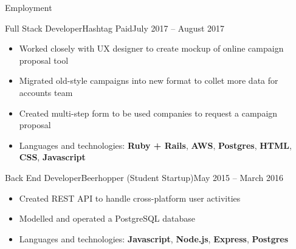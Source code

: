 \documentclass[calibri]{mcdowellcv}
\begin{document}
    \makeheader

    \begin{cvsection}{Employment}
        \begin{cvsubsection}{Full Stack Developer}{Hashtag Paid}{July 2017 -- August 2017}
            \begin{itemize}
                \item Worked closely with UX designer to create mockup of online campaign proposal tool
                \item Migrated old-style campaigns into new format to collet more data for accounts team
                \item Created multi-step form to be used companies to request a campaign proposal
                \item Languages and technologies: \textbf{Ruby + Rails}, \textbf{AWS}, \textbf{Postgres}, \textbf{HTML}, \textbf{CSS}, \textbf{Javascript}
            \end{itemize}
        \end{cvsubsection}

        \begin{cvsubsection}{Back End Developer}{Beerhopper (Student Startup)}{May 2015 -- March 2016}
            \begin{itemize}
                \item Created REST API to handle cross-platform user activities
                \item Modelled and operated a PostgreSQL database
                \item Languages and technologies: \textbf{Javascript}, \textbf{Node.js}, \textbf{Express}, \textbf{Postgres}
            \end{itemize}
        \end{cvsubsection}
    \end{cvsection}
\end{document}

